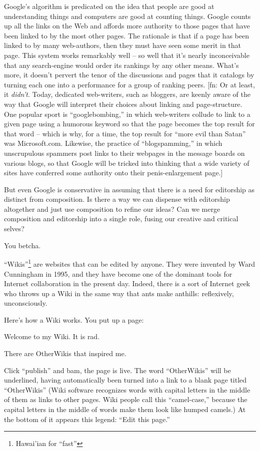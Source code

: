 Google's algorithm is predicated on the idea that people are good
at understanding things and computers are good at counting things.
Google counts up all the links on the Web and affords more
authority to those pages that have been linked to by the most other
pages. The rationale is that if a page has been linked to by many
web-authors, then they must have seen some merit in that page. This
system works remarkably well -- so well that it's nearly
inconceivable that any search-engine would order its rankings by
any other means. What's more, it doesn't pervert the tenor of the
discussions and pages that it catalogs by turning each one into a
performance for a group of ranking peers. [fn: Or at least, it
\emph{didn't}. Today, dedicated web-writers, such as bloggers,
are keenly aware of the way that Google will interpret their
choices about linking and page-structure. One popular sport is
``googlebombing,'' in which web-writers collude to link to a given
page using a humorous keyword so that the page becomes the top
result for that word -- which is why, for a time, the top result
for ``more evil than Satan'' was Microsoft.com. Likewise, the
practice of ``blogspamming,'' in which unscrupulous spammers post
links to their webpages in the message boards on various blogs, so
that Google will be tricked into thinking that a wide variety of
sites have conferred some authority onto their penis-enlargement
page.]

But even Google is conservative in assuming that there is a need
for editorship as distinct from composition. Is there a way we can
dispense with editorship altogether and just use composition to
refine our ideas? Can we merge composition and editorship into a
single role, fusing our creative and critical selves?

You betcha.

``Wikis''\footnote{Hawai'ian for ``fast''} are websites that can be edited
by anyone. They were invented by Ward Cunningham in 1995, and they
have become one of the dominant tools for Internet collaboration in
the present day. Indeed, there is a sort of Internet geek who
throws up a Wiki in the same way that ants make anthills:
reflexively, unconsciously.

Here's how a Wiki works. You put up a page:

Welcome to my Wiki. It is rad.

There are OtherWikis that inspired me.

Click ``publish'' and bam, the page is live. The word ``OtherWikis''
will be underlined, having automatically been turned into a link to
a blank page titled ``OtherWikis'' (Wiki software recognizes words
with capital letters in the middle of them as links to other pages.
Wiki people call this ``camel-case,'' because the capital letters in
the middle of words make them look like humped camels.) At the
bottom of it appears this legend: ``Edit this page.''

